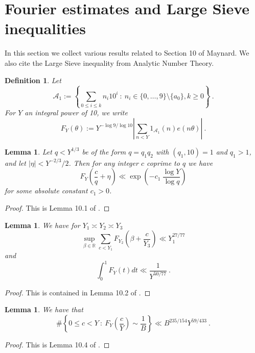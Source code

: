 \documentclass{amsart}
\newtheorem{lemma}[theorem]{Lemma}
\numberwithin{equation}{subsection}
\newtheorem{definition}[theorem]{Definition}
\begin{document}
\section{Fourier estimates and Large Sieve inequalities}

In this section we collect various results related to Section 10 of Maynard. We also cite the Large Sieve inequality from Analytic Number Theory.

\begin{definition}\label{def51}
Let
$$\mathcal{A}_1:=\left\{\sum_{0\leq i\leq k} n_i10^i\::\: n_i\in\{0, \ldots, 9\}\setminus\{a_0\}, k\geq 0  \right\}\:.$$
For $Y$ an integral power of 10, we write
$$F_Y(\theta):=Y^{-\log 9/\log 10} \left| \sum_{n<Y} 1_{\mathcal{A}_1}(n) e(n\theta)  \right|\:.$$
\end{definition}

\begin{lemma}\label{lem51}
Let $q<Y^{1/3}$ be of the form $q=q_1q_2$ with $(q_1, 10)=1$ and $q_1>1$, and let $|\eta|<Y^{-2/3}/2$. Then for any integer $c$ coprime to $q$ we have
$$F_Y\left(\frac{c}{q}+\eta\right)\ll \exp\left(-c_1\:\frac{\log Y}{\log q}\right)$$
for some absolute constant $c_1>0$.
\end{lemma}
\begin{proof}
This is Lemma 10.1 of \cite{maynard}.
\end{proof}

\begin{lemma}\label{lem52}
We have for $Y_1\asymp Y_2 \asymp Y_3$
$$\sup_{\beta\in\mathbb{R}}\sum_{c< Y_1} F_{Y_2}\left(\beta+\frac{c}{Y_3}\right)\ll Y_1^{27/77}$$
and
$$\int_0^1 F_Y(t)dt\ll \frac{1}{Y^{50/77}}\:.$$
\end{lemma}
\begin{proof}
This is contained in Lemma 10.2 of \cite{maynard}.
\end{proof}

\begin{lemma}\label{lem53}
We have that
$$\#\left\{0\leq c< Y\::\: F_{Y}\left(\frac{c}{Y}\right)\sim \frac{1}{B}  \right\} \ll B^{235/154}Y^{59/433}\:.$$
\end{lemma}
\begin{proof}
This is Lemma 10.4 of \cite{maynard}.
\end{proof}
\end{document}
